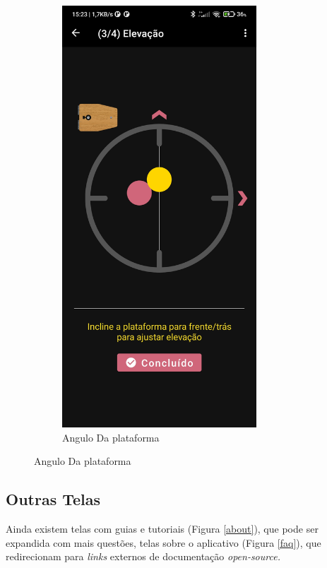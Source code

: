 \begin{figure}[!htb]
\begin{subfigure}[b]{0.3\textwidth}
		\includegraphics[width=0.8\textwidth]{figuras/desAplicativo/elevacao}
		\caption{Angulo Da plataforma}
		\label{elevacaoplataforma}
	\end{subfigure}
\end{figure}

\subsection{Outras Telas}

Ainda existem telas com guias e tutoriais (Figura \ref{about}), que pode ser expandida com mais questões, telas sobre o aplicativo (Figura \ref{faq}), que redirecionam para \textit{links} externos de documentação \textit{open-source.}

